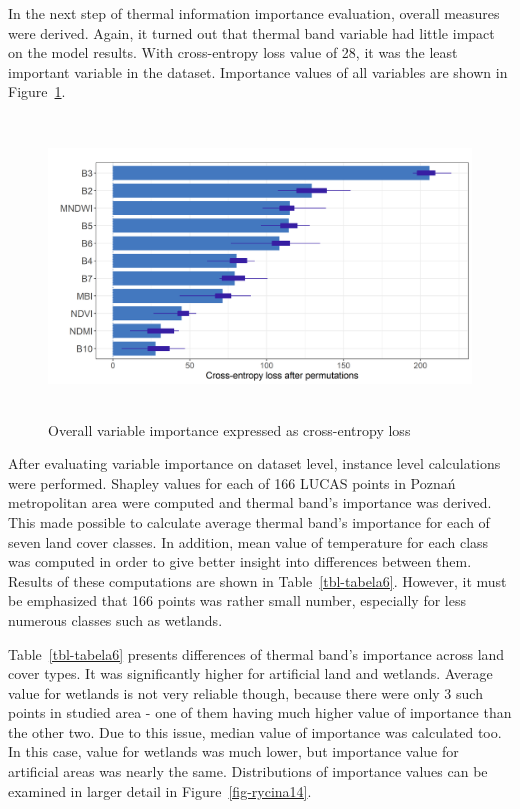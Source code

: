 \documentclass{amuthesis}
\begin{document}
In the next step of thermal information importance evaluation, overall
measures were derived. Again, it turned out that thermal band variable
had little impact on the model results. With cross-entropy loss value of
28, it was the least important variable in the dataset. Importance
values of all variables are shown in Figure~\ref{fig-rycina13}.

\begin{figure}[H]

{\centering \includegraphics[width=5.625in,height=3.125in]{./figures/importance.png}

}

\caption{\label{fig-rycina13}Overall variable importance expressed as
cross-entropy loss}

\end{figure}

After evaluating variable importance on dataset level, instance level
calculations were performed. Shapley values for each of 166 LUCAS points
in Poznań metropolitan area were computed and thermal band's importance
was derived. This made possible to calculate average thermal band's
importance for each of seven land cover classes. In addition, mean value
of temperature for each class was computed in order to give better
insight into differences between them. Results of these computations are
shown in Table~\ref{tbl-tabela6}. However, it must be emphasized that
166 points was rather small number, especially for less numerous classes
such as wetlands.

Table~\ref{tbl-tabela6} presents differences of thermal band's
importance across land cover types. It was significantly higher for
artificial land and wetlands. Average value for wetlands is not very
reliable though, because there were only 3 such points in studied area -
one of them having much higher value of importance than the other two.
Due to this issue, median value of importance was calculated too. In
this case, value for wetlands was much lower, but importance value for
artificial areas was nearly the same. Distributions of importance values
can be examined in larger detail in Figure~\ref{fig-rycina14}.
\end{document}
